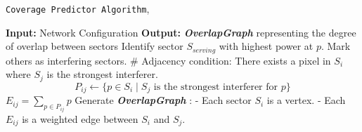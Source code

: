 \begin{algorithm} [t!]
    \caption{
        \texttt{Coverage Predictor Algorithm},
    }
    \begin{algorithmic} [1]
            \Statex \textbf{Input:} Network Configuration 
            \Statex \textbf{Output:} \textit{\textbf{OverlapGraph}} representing the degree of overlap between sectors
                \State Identify sector $S_{serving}$ with highest power at $p$.
                \State Mark others as interfering sectors.
            \EndFor
                    \Statex \# Adjacency condition: There exists a pixel in $S_i$ where $S_j$ is the strongest interferer.
                        \State \[ P_{ij} \gets \{p \in S_i \mid S_j \text{ is the strongest interferer for } p\} \]
                        \State $E_{ij} = \sum_{p \in P_{ij}} p$    
                    \EndIf
                \EndFor
            \EndFor
            \State Generate \textit{\textbf{OverlapGraph}} :
                \Statex \quad - Each sector $S_i$ is a vertex.
                \Statex \quad - Each $E_{ij}$ is a weighted edge between $S_i$ and $S_j$.
        \EndFunction
    \end{algorithmic}
    \label{alg:coverage_algo}
\end{algorithm}
